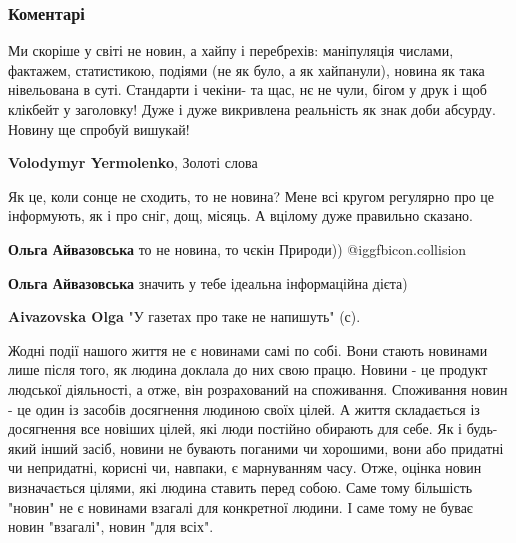  
 
 
 
 
\subsubsection{Коментарі}

\begin{itemize} %

Ми скоріше у світі не новин, а хайпу і перебрехів: маніпуляція числами,
фактажем, статистикою, подіями (не як було, а як хайпанули), новина як така
нівельована в суті. Стандарти і чекіни- та щас, нє не чули, бігом у друк і щоб
клікбейт у заголовку! Дуже і дуже викривлена реальність як знак доби абсурду.
Новину ще спробуй вишукай!

\textbf{Volodymyr Yermolenko}, Золоті слова


Як це, коли сонце не сходить, то не новина? Мене всі кругом регулярно про це
інформують, як і про сніг, дощ, місяць. А вцілому дуже правильно сказано.

\begin{itemize} %
\textbf{Ольга Айвазовська} то не новина, то чєкін Природи)) @igg{fbicon.collision} 

\textbf{Ольга Айвазовська} значить у тебе ідеальна інформаційна дієта)

\textbf{Aivazovska Olga} "У газетах про таке не напишуть" (с).
\end{itemize} %


Жодні події нашого життя не є новинами самі по собі. Вони стають новинами лише
після того, як людина доклала до них свою працю. Новини - це продукт людської
діяльності, а отже, він розрахований на споживання. Споживання новин - це один
із засобів досягнення людиною своїх цілей. А життя складається із досягнення
все новіших цілей, які люди постійно обирають для себе. Як і будь-який інший
засіб, новини не бувають поганими чи хорошими, вони або придатні чи непридатні,
корисні чи, навпаки, є марнуванням часу. Отже, оцінка новин визначається
цілями, які людина ставить перед собою. Саме тому більшість "новин" не є
новинами взагалі для конкретної людини. І саме тому не буває новин "взагалі",
новин "для всіх".


\end{itemize}
